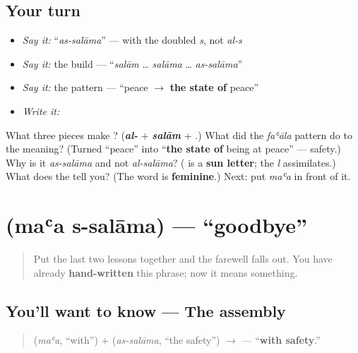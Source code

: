 \subsection*{Your turn}
\begin{itemize}
\raggedright
  \item \emph{Say it:} \textquotedblleft{}\emph{as-salāma}\textquotedblright{} — with the doubled \emph{s}, not \emph{al-s}
  \item \emph{Say it:} the build — \textquotedblleft{}\emph{salām} … \emph{salāma} … \emph{as-salāma}\textquotedblright{}
  \item \emph{Say it:} the pattern — \textquotedblleft{}peace $\to$ \textbf{the state of} peace\textquotedblright{}
  \item \emph{Write it:} \textbf{}
\end{itemize}

\begin{tcolorbox}[breakable,colback=teal!4,colframe=teal!35!black,title={Before you move on}]
What three pieces make \textbf{}? (\emph{\textbf{al-}} + \emph{\textbf{salām}} + \emph{\textbf{}}.) What did the \emph{faʿāla} pattern do to the meaning? (Turned \textquotedblleft{}peace\textquotedblright{} into \textquotedblleft{}\textbf{the state of} being at peace\textquotedblright{} — safety.) Why is it \emph{as-salāma} and not \emph{al-salāma}? (\textbf{} is a \textbf{sun letter}; the \emph{l} assimilates.) What does the \textbf{} tell you? (The word is \textbf{feminine}.) Next: put \emph{maʿa} in front of it.
\end{tcolorbox}
\section[\texorpdfstring{\ar{مع} \ar{السلامة} (maʿa s-salāma)}{مع السلامة (maʿa s-salāma)}]{  (maʿa s-salāma) — \textquotedblleft{}goodbye\textquotedblright{}}

\label{lesson:AR-C04-maa-salama}



\begin{quote}
Put the last two lessons together and the farewell falls out. You have already \textbf{hand-written} this phrase; now it means something.
\end{quote}

\subsection*{You'll want to know — The assembly}
\begin{quote}
\textbf{} (\emph{maʿa}, \textquotedblleft{}with\textquotedblright{}) + \textbf{} (\emph{as-salāma}, \textquotedblleft{}the safety\textquotedblright{}) $\to$ \textbf{ } — \textquotedblleft{}\textbf{with safety}.\textquotedblright{}
\end{quote}

